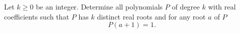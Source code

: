 Let $k\geq 0$ be an integer.
Determine all polynomials $P$ of degree $k$ with real coefficients such that
$P$ has $k$ distinct real roots and for any root $a$ of $P$
$$P(a+1) = 1.$$
